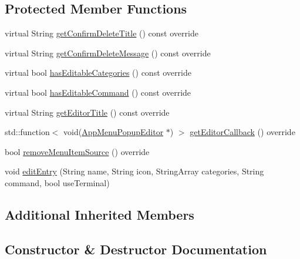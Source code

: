\subsection*{Protected Member Functions}
\begin{DoxyCompactItemize}
\item 
virtual String \mbox{\hyperlink{classDesktopEntryMenuItem_a4ec791310ca94a2e9e5d3fab24656502}{get\+Confirm\+Delete\+Title}} () const override
\item 
virtual String \mbox{\hyperlink{classDesktopEntryMenuItem_ae08d54a981ea02f2fcac9a8aba51e65f}{get\+Confirm\+Delete\+Message}} () const override
\item 
virtual bool \mbox{\hyperlink{classDesktopEntryMenuItem_a6fcceaef6c50610d94fdec1f3f6e4dd5}{has\+Editable\+Categories}} () const override
\item 
virtual bool \mbox{\hyperlink{classDesktopEntryMenuItem_a60ed757bf4ebe33537b7204d005ecc78}{has\+Editable\+Command}} () const override
\item 
virtual String \mbox{\hyperlink{classDesktopEntryMenuItem_a0b57ee9d99e2ddf037ba8fe91c725bab}{get\+Editor\+Title}} () const override
\item 
std\+::function$<$ void(\mbox{\hyperlink{classAppMenuPopupEditor}{App\+Menu\+Popup\+Editor}} $\ast$) $>$ \mbox{\hyperlink{classDesktopEntryMenuItem_a5f32e4ceb94436758097c546aa22928f}{get\+Editor\+Callback}} () override
\item 
bool \mbox{\hyperlink{classDesktopEntryMenuItem_a299ebe632156d897ccbde21519ed72e4}{remove\+Menu\+Item\+Source}} () override
\item 
void \mbox{\hyperlink{classDesktopEntryMenuItem_a4c8c78e253fb65da989fc0643962865f}{edit\+Entry}} (String name, String icon, String\+Array categories, String command, bool use\+Terminal)
\end{DoxyCompactItemize}
\subsection*{Additional Inherited Members}


\subsection{Constructor \& Destructor Documentation}
\mbox{\label{classDesktopEntryMenuItem_a50adefcfca937d39fff8d79375637642}} 
